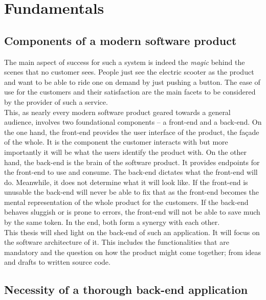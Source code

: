\documentclass[12pt,a4paper]{report}
\begin{document}
\chapter{Fundamentals} \label{chap:fundamentals}


\section{Components of a modern software product}

The main aspect of success for such a system is indeed the \emph{magic} behind the scenes
that no customer sees. People just see the electric scooter as the product and
want to be able to ride one on demand by just pushing a button.
The ease of use for the customers and their satisfaction are the main facets
to be considered by the provider of such a service.\\
This, as nearly every modern software product geared towards a general audience,
involves two foundational components – a front-end and a back-end.
On the one hand, the front-end provides the user interface of the product, the façade of the whole.
It is the component the customer interacts with but more importantly it will be
what the users identify the product with.
On the other hand, the back-end is the brain of the software product.
It provides endpoints for the front-end to use and consume. The back-end dictates
what the front-end will do. Meanwhile, it does not determine what it will look like.
If the front-end is unusable the back-end will never be able to fix that as the
front-end becomes the mental representation of the whole product for the customers.
If the back-end behaves sluggish or is prone to errors, the front-end will not be able to save much
by the same token. In the end, both form a synergy with each other.\\
This thesis will shed light on the back-end of such an application.
It will focus on the software architecture of it.
This includes the functionalities that are mandatory and the question on how the product
might come together; from ideas and drafts to written source code.


\section{Necessity of a thorough back-end application}
\end{document}
